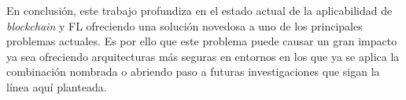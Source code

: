 En conclusión, este trabajo profundiza en el estado actual de la aplicabilidad de \textit{blockchain} y \ac{FL} ofreciendo una solución novedosa a uno de los principales problemas actuales. Es por ello que este problema puede causar un gran impacto ya sea ofreciendo arquitecturas más seguras en entornos en los que ya se aplica la combinación nombrada o abriendo paso a futuras investigaciones que sigan la línea aquí planteada.